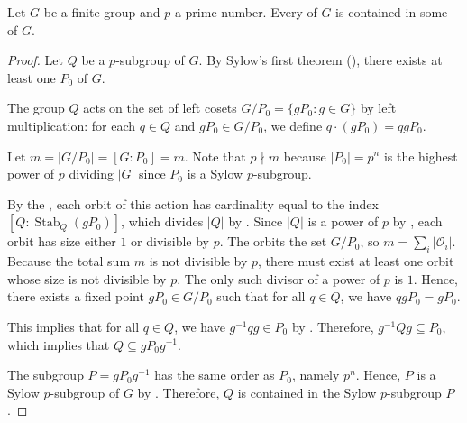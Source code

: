 \begin{corollary} \label{corollary:every_p_subgroup_of_a_finite_group_is_contained_in_some_sylow_p_subgroup}
Let $G$ be a finite group and $p$ a prime number.
Every  of $G$ is contained in some  of $G$.
\end{corollary}
\begin{proof}
    Let $Q$ be a $p$-subgroup of $G$. By Sylow's first theorem (), there exists at least one  $P_0$ of $G$.

    The group $Q$ acts on the set of left cosets $G/P_0 = \{gP_0 : g \in G\}$ by left multiplication: for each $q \in Q$ and $gP_0 \in G/P_0$, we define $q \cdot (gP_0) = qgP_0$.

    Let $m = |G/P_0| = [G : P_0] = m$. Note that $p \nmid m$ because $|P_0| = p^n$ is the highest power of $p$ dividing $|G|$ since $P_0$ is a Sylow $p$-subgroup.

    By the , each orbit of this action has cardinality equal to the index $[Q : \operatorname{Stab}_Q(gP_0)]$, which divides $|Q|$ by . Since $|Q|$ is a power of $p$ by , each orbit has size either $1$ or divisible by $p$. The orbits  the set $G/P_0$, so $m = \sum_i |\mathcal{O}_i|$. Because the total sum $m$ is not divisible by $p$, there must exist at least one orbit whose size is not divisible by $p$. The only such divisor of a power of $p$ is $1$. Hence, there exists a fixed point $gP_0 \in G/P_0$ such that for all $q \in Q$, we have $qgP_0 = gP_0$.

    This implies that for all $q \in Q$, we have $g^{-1}qg \in P_0$ by . Therefore, $g^{-1}Qg \subseteq P_0$, which implies that $Q \subseteq gP_0g^{-1}$.

    The subgroup $P = gP_0g^{-1}$ has the same order as $P_0$, namely $p^n$. Hence, $P$ is a Sylow $p$-subgroup of $G$ by . Therefore, $Q$ is contained in the Sylow $p$-subgroup $P$.
\end{proof}
